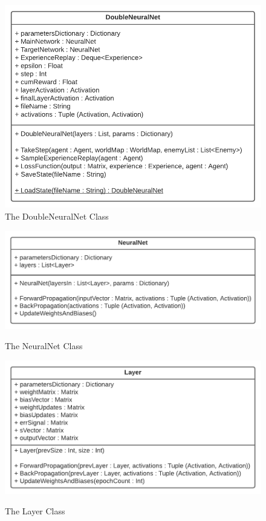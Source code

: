 \begin{flushleft}
                \begin{figure}[H]
                    \centering
                    \includegraphics[width=.70\textwidth]{Images/Design/Classes/DoubleNeuralNet.png} 
                    \caption*{The DoubleNeuralNet Class}
                \end{figure}
                \begin{figure}[H]
                    \centering
                    \includegraphics[width=.80\textwidth]{Images/Design/Classes/NeuralNet.png} \\
                    \caption*{The NeuralNet Class}
                \end{figure}
                \begin{figure}[H]
                    \centering
                    \includegraphics[width=.75\textwidth]{Images/Design/Classes/Layer.png} \\
                    \caption*{The Layer Class}
                \end{figure}

\end{flushleft}
